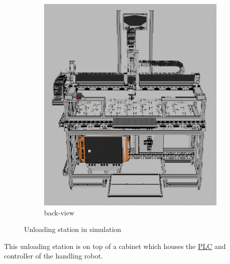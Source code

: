 \begin{figure}[h]
\begin{subfigure}{0.45\textwidth}
        \includegraphics[width=\textwidth]{figures/unloading-station-back-blender.png} %
        \caption{back-view}
        \label{fig:unloading-station-back}
    \end{subfigure}
    \caption{Unloading station in simulation}
    \label{fig:unloading-station}
\end{figure}

This unloading station is on top of a cabinet which houses the \hyperref[acro:PLC]{PLC} and controller of the handling robot.
